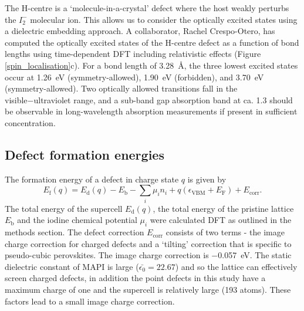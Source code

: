 The H-centre is a `molecule-in-a-crystal' defect where the host weakly perturbs the $I_2^-$ molecular ion.
This allows us to consider the optically excited states using a dielectric embedding approach.
A collaborator, Rachel Crespo-Otero, has computed the optically excited states of the H-centre defect as a function of bond lengths using time-dependent DFT including relativistic effects (Figure \ref{spin_localisation}c).\autocite{Whalley2017b} 
For a bond length of \SI{3.28}{\angstrom}, the three lowest excited states occur at \SI{1.26}{\electronvolt} (symmetry-allowed), \SI{1.90}{\electronvolt} (forbidden), and \SI{3.70}{\electronvolt} (symmetry-allowed). Two optically allowed transitions fall in the visible−ultraviolet range, and a sub-band gap absorption band at ca. \SI{1.3}{\electronvolts} should be observable in long-wavelength absorption measurements if present in sufficient concentration.

\subsection{Defect formation energies} \label{ss:dfe}

The formation energy of a defect in charge state $q$ is given by
\begin{equation} \label{eqn_formation_energy}
E_\mathrm{f}(q) = E_\mathrm{d}(q) - E_\mathrm{b} - \sum_i \mu_i n_i + q(\epsilon_\mathrm{VBM}+E_\mathrm{F}) + E_\mathrm{corr}.
\end{equation}
The total energy of the supercell $E_\mathrm{d}(q)$, the total energy of the pristine lattice $E_\mathrm{b}$ and the iodine chemical potential $\mu_i$ were calculated DFT as outlined in the methods section.
The defect correction $E_\mathrm{corr}$ consists of two terms - the image charge correction for charged defects and a `tilting' correction that is specific to pseudo-cubic perovskites.
The image charge correction is \SI{-0.057}{eV}. The static dielectric constant of MAPI is large ($\bar{\epsilon_0}=22.67$)\autocite{Brivio2013} and so the lattice can effectively screen charged defects, in addition the point defects in this study have a maximum charge of one and the supercell is relatively large (193 atoms). These factors lead to a small image charge correction.

